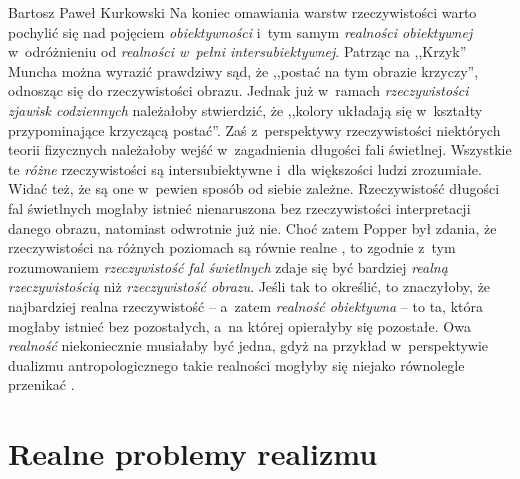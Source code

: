 \begin{artplenv}{Bartosz Paweł Kurkowski}
Na koniec omawiania warstw rzeczywistości warto pochylić się nad pojęciem \textit{obiektywności} i~tym samym
\textit{realności obiektywnej} w~odróżnieniu od \textit{realności w~pełni intersubiektywnej}. Patrząc na ,,Krzyk'' Muncha
można wyrazić prawdziwy sąd, że ,,postać na tym obrazie krzyczy'', odnosząc się do rzeczywistości obrazu. Jednak
już w~ramach \textit{rzeczywistości zjawisk codziennych} należałoby stwierdzić, że ,,kolory układają się w~kształty
przypominające krzyczącą postać''. Zaś z~perspektywy rzeczywistości niektórych teorii fizycznych należałoby
wejść w~zagadnienia długości fali świetlnej. Wszystkie te \textit{różne }rzeczywistości są intersubiektywne i~dla większości
ludzi zrozumiałe. Widać też, że są one w~pewien sposób od siebie zależne. Rzeczywistość długości fal świetlnych mogłaby
istnieć nienaruszona bez rzeczywistości interpretacji danego obrazu, natomiast odwrotnie już nie. Choć zatem Popper był
zdania, że rzeczywistości na różnych poziomach są równie realne
\parencite[s.~265]{grobler_metodologia_2006},
to
zgodnie z~tym rozumowaniem \textit{rzeczywistość fal świetlnych} zdaje się być bardziej \textit{realną rzeczywistością}
niż \textit{rzeczywistość obrazu}. Jeśli tak to określić, to znaczyłoby, że najbardziej realna
rzeczywistość -- a~zatem\textit{ realność obiektywna} -- to ta, która mogłaby istnieć bez pozostałych, a~na której opierałyby się
pozostałe. Owa \textit{realność }niekoniecznie musiałaby być jedna, gdyż na przykład w~perspektywie dualizmu
antropologicznego takie realności mogłyby się niejako równolegle przenikać
\parencite[por.][]{judycki_swiadomosc_2004}.

\section{Realne problemy realizmu}


\end{artplenv}
